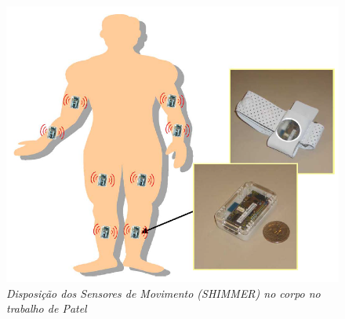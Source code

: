 \begin{figure}
 \centering
 \includegraphics[scale=0.3]{./img/patel-shimmer.png}
\caption[Disposição dos Sensores de Movimento (SHIMMER) no corpo no trabalho de Patel]{\textit{Disposição dos Sensores de Movimento (SHIMMER) no corpo no trabalho de Patel ~\cite{patel_monitoring_2009}}}
 \label{fig:patel-shimmer}
\end{figure}




